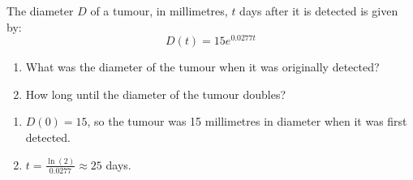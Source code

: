 {The diameter $D$ of a tumour, in millimetres, $t$ days after it is detected is given by:  \[D(t) = 15e^{0.0277t} \]

\begin{enumerate}

\item  What was the diameter of the tumour when it was originally detected?

\item  How long until the diameter of the tumour doubles?

\end{enumerate}}
{ \begin{enumerate} \item $D(0) = 15$, so the tumour was 15 millimetres in diameter when it was first detected.

\item  $t = \frac{\ln(2)}{0.0277} \approx 25$ days.

\end{enumerate}}